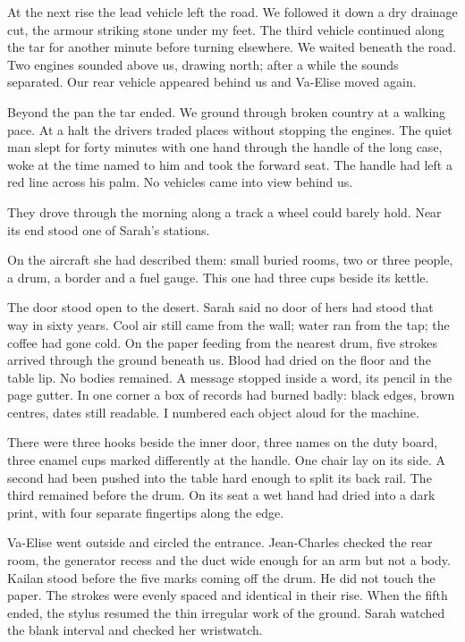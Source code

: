 At the next rise the lead vehicle left the road. We followed it down a dry drainage cut, the armour striking stone under my feet. The third vehicle continued along the tar for another minute before turning elsewhere. We waited beneath the road. Two engines sounded above us, drawing north; after a while the sounds separated. Our rear vehicle appeared behind us and Va-Elise moved again.\par

Beyond the pan the tar ended. We ground through broken country at a walking pace. At a halt the drivers traded places without stopping the engines. The quiet man slept for forty minutes with one hand through the handle of the long case, woke at the time named to him and took the forward seat. The handle had left a red line across his palm. No vehicles came into view behind us.\par

\ornament

They drove through the morning along a track a wheel could barely hold. Near its end stood one of Sarah's stations.\par

On the aircraft she had described them: small buried rooms, two or three people, a drum, a border and a fuel gauge. This one had three cups beside its kettle.\par

The door stood open to the desert. Sarah said no door of hers had stood that way in sixty years. Cool air still came from the wall; water ran from the tap; the coffee had gone cold. On the paper feeding from the nearest drum, five strokes arrived through the ground beneath us. Blood had dried on the floor and the table lip. No bodies remained. A message stopped inside a word, its pencil in the page gutter. In one corner a box of records had burned badly: black edges, brown centres, dates still readable. I numbered each object aloud for the machine.\par

There were three hooks beside the inner door, three names on the duty board, three enamel cups marked differently at the handle. One chair lay on its side. A second had been pushed into the table hard enough to split its back rail. The third remained before the drum. On its seat a wet hand had dried into a dark print, with four separate fingertips along the edge.\par

Va-Elise went outside and circled the entrance. Jean-Charles checked the rear room, the generator recess and the duct wide enough for an arm but not a body. Kailan stood before the five marks coming off the drum. He did not touch the paper. The strokes were evenly spaced and identical in their rise. When the fifth ended, the stylus resumed the thin irregular work of the ground. Sarah watched the blank interval and checked her wristwatch.\par

